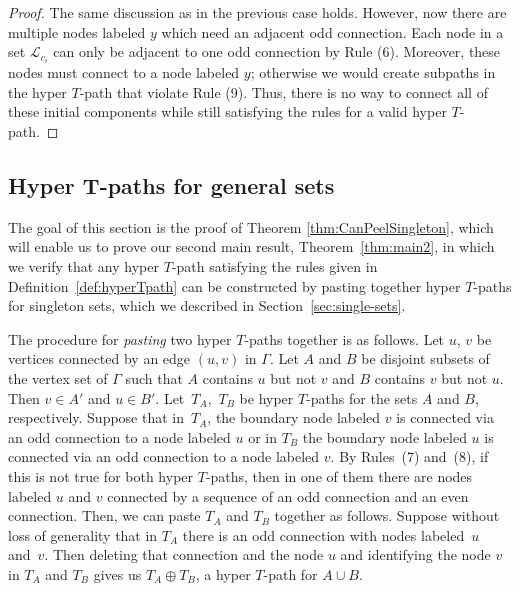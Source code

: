 \documentclass[pdftex]{sigma}
\numberwithin{equation}{section}
\begin{document}
\begin{proof}
The same discussion as in the previous case holds. However, now there are multiple nodes labeled $y$ which need an adjacent odd connection. Each node in a set $\mathcal{L}_{c_i}$ can only be adjacent to one odd connection by Rule (6). Moreover, these nodes must connect to a node labeled $y$; otherwise we would create subpaths in the hyper $T$-path that violate Rule (9).
Thus, there is no way to connect all of these initial components while still satisfying the rules for a valid hyper $T$-path.
\end{proof}

\subsection[Hyper T-paths for general sets]{Hyper $\boldsymbol{T}$-paths for general sets}\label{sec:gen-sets}

The goal of this section is the proof of Theorem \ref{thm:CanPeelSingleton}, which will enable us to prove our second main result, Theorem~\ref{thm:main2}, in which we verify that any hyper $T$-path satisfying the rules given in Definition~\ref{def:hyperTpath} can be constructed by pasting together hyper $T$-paths for singleton sets, which we described in Section~\ref{sec:single-sets}.

The procedure for \emph{pasting} two hyper $T$-paths together is as follows. Let $u$, $v$ be vertices connected by an edge $(u,v)$ in $\Gamma$. Let $A$ and $B$ be disjoint subsets of the vertex set of $\Gamma$ such that $A$ contains $u$ but not $v$ and $B$ contains $v$ but not $u$. Then $v \in A'$ and $u \in B'$. Let~$T_A$,~$T_B$ be hyper $T$-paths for the sets $A$ and $B$, respectively. Suppose that in~$T_A$, the boundary node labeled $v$ is connected via an odd connection to a node labeled $u$ or in $T_B$ the boundary node labeled $u$ is connected via an odd connection to a node labeled $v$. By Rules~(7) and~(8), if this is not true for both hyper $T$-paths, then in one of them there are nodes labeled $u$ and $v$ connected by a sequence of an odd connection and an even connection. Then, we can paste $T_A$ and $T_B$ together as follows. Suppose without loss of generality that in $T_A$ there is an odd connection with nodes labeled~$u$ and~$v$. Then deleting that connection and the node $u$ and identifying the node $v$ in $T_A$ and $T_B$ gives us $T_A\oplus T_B$, a hyper $T$-path for $A \cup B$.
\end{document}
